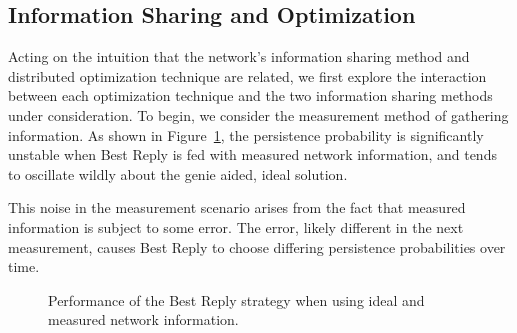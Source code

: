\documentclass[11pt]{IEEEtran}
\theoremstyle{definition}
\begin{document}
\subsection{Information Sharing and Optimization}

Acting on the intuition that the network's information sharing method and distributed optimization technique are related, we first explore the interaction between each optimization technique and the two information sharing methods under consideration.  To begin, we consider the measurement method of gathering information.  As shown in Figure~\ref{fig:BestReply}, the persistence probability is significantly unstable when Best Reply is fed with measured network information, and tends to oscillate wildly about the genie aided, ideal solution.

This noise in the measurement scenario  arises from the fact that measured information is subject to some error.  The error, likely different in the next measurement, causes Best Reply to choose differing persistence probabilities over time.  

\begin{figure}[htp]
\begin{center}
  \caption{Performance of the Best Reply strategy when using ideal and measured
  network information.}
  \label{fig:BestReply}
\end{center}
\end{figure}
\end{document}

